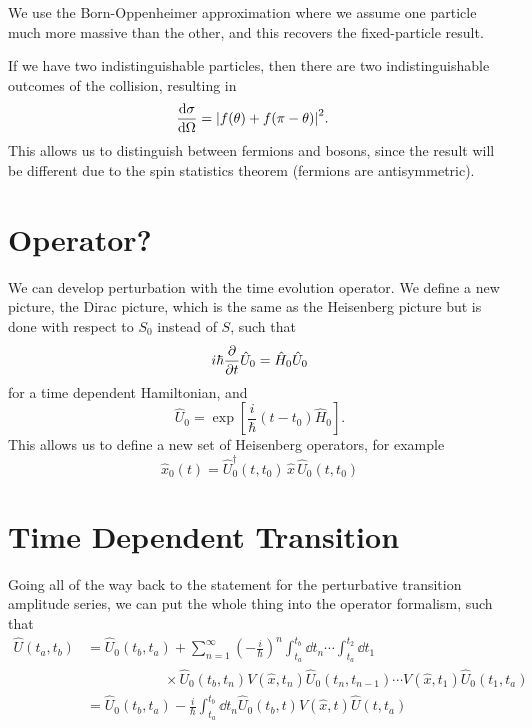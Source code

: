 \documentclass[]{revision-notes}
\begin{document}
We use the Born-Oppenheimer approximation where we assume one particle much more massive than the other, and this recovers the fixed-particle result.

If we have two indistinguishable particles, then there are two indistinguishable outcomes of the collision, resulting in
\begin{align*}
  \dv{\sigma}{\Omega} &= \abs{f(\theta) + f(\pi - \theta)}^2.
\end{align*}
This allows us to distinguish between fermions and bosons, since the result will be different due to the spin statistics theorem (fermions are antisymmetric).

\section{Operator?}
We can develop perturbation with the time evolution operator.
We define a new picture, the Dirac picture, which is the same as the Heisenberg picture but is done with respect to \( S_0 \) instead of \(S\), such that
\begin{equation*}
  i\hbar \pdv{t} \hat{U}_0 = \hat{H}_0 \hat{U}_0
\end{equation*}
for a time dependent Hamiltonian, and
\begin{equation*}
  \hat{U}_0 = \exp[\frac{i}{\hbar} (t - t_0) \hat{H}_0].
\end{equation*}
This allows us to define a new set of Heisenberg operators, for example
\[ \hat{x}_0 (t) = \hat{U}_0^\dagger (t, t_0) \, \hat{x} \,  \hat{U}_0(t, t_0)\]

\section{Time Dependent Transition}
Going all of the way back to the statement for the perturbative transition amplitude series, we can put the whole thing into the operator formalism, such that
\begin{align*}
  \hat{U}(t_a, t_b) &= \hat{U}_0 (t_b, t_a) + \sum_{n=1}^\infty (-\frac{i}{\hbar})^n \int^{t_b}_{t_a} \dd{t_n} \cdots \int^{t_2}_{t_a} \dd{t_1}\\
  &\mspace{100mu}\times \hat{U}_0(t_b, t_n) V(\hat{x}, t_n) \hat{U}_0(t_n, t_{n-1}) \cdots V(\hat{x}, t_1) \hat{U}_0(t_1, t_a)\\
  &= \hat{U}_0 (t_b, t_a) -\frac{i}{\hbar} \int^{t_b}_{t_a} \dd{t_n} \hat{U}_0(t_b, t) V(\hat{x}, t) \hat{U}(t, t_{a})\\
\end{align*}
\end{document}
